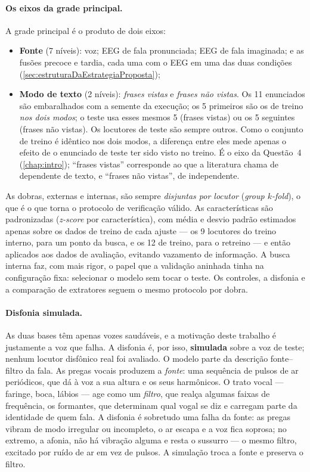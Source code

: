 				\paragraph{Os eixos da grade principal.} A grade principal é o produto de dois eixos:
				\begin{itemize}
					\item \textbf{Fonte} (7 níveis): voz; \ac{EEG} de fala pronunciada; \ac{EEG} de fala imaginada; e as fusões precoce e tardia, cada uma com o \ac{EEG} em uma das duas condições (\autoref{sec:estruturaDaEstrategiaProposta});
					\item \textbf{Modo de texto} (2 níveis): \textit{frases vistas} e \textit{frases não vistas}. Os 11 enunciados são embaralhados com a semente da execução; os 5 primeiros são os de treino \emph{nos dois modos}; o teste usa esses mesmos 5 (frases vistas) ou os 5 seguintes (frases não vistas). Os locutores de teste são sempre outros. Como o conjunto de treino é idêntico nos dois modos, a diferença entre eles mede apenas o efeito de o enunciado de teste ter sido visto no treino. É o eixo da Questão~4 (\autoref{chap:intro}); ``frases vistas'' corresponde ao que a literatura chama de dependente de texto, e ``frases não vistas'', de independente.
				\end{itemize}
				As dobras, externas e internas, são sempre \emph{disjuntas por locutor} (\textit{group $k$-fold}), o que é o que torna o protocolo de verificação válido. As características são padronizadas (\textit{z-score} por característica), com média e desvio padrão estimados apenas sobre os dados de treino de cada ajuste --- os 9 locutores do treino interno, para um ponto da busca, e os 12 de treino, para o retreino --- e então aplicados aos dados de avaliação, evitando vazamento de informação. A busca interna faz, com mais rigor, o papel que a validação aninhada tinha na configuração fixa: selecionar o modelo sem tocar o teste. Os controles, a disfonia e a comparação de extratores seguem o mesmo protocolo por dobra.

				\paragraph{Disfonia simulada.}\label{sec:disfoniaSimulada} As duas bases têm apenas vozes saudáveis, e a motivação deste trabalho é justamente a voz que falha. A disfonia é, por isso, \textbf{simulada} sobre a voz de teste; nenhum locutor disfônico real foi avaliado. O modelo parte da descrição fonte--filtro da fala. As pregas vocais produzem a \emph{fonte}: uma sequência de pulsos de ar periódicos, que dá à voz a sua altura e os seus harmônicos. O trato vocal --- faringe, boca, lábios --- age como um \emph{filtro}, que realça algumas faixas de frequência, os formantes, que determinam qual vogal se diz e carregam parte da identidade de quem fala. A disfonia é sobretudo uma falha da fonte: as pregas vibram de modo irregular ou incompleto, o ar escapa e a voz fica soprosa; no extremo, a afonia, não há vibração alguma e resta o sussurro --- o mesmo filtro, excitado por ruído de ar em vez de pulsos. A simulação troca a fonte e preserva o filtro.

